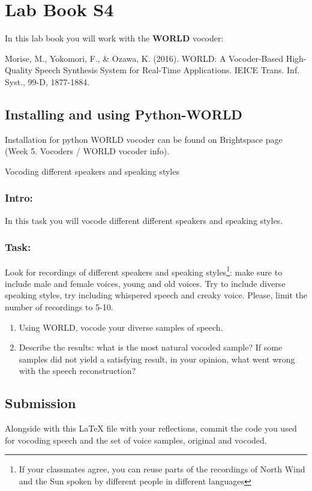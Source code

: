 \documentclass{../labbook}
\begin{document}
\section{Lab Book S4}
\noindent In this lab book you will work with the \textbf{WORLD} vocoder:

\noindent Morise, M., Yokomori, F., \& Ozawa, K. (2016). WORLD: A Vocoder-Based High-Quality Speech Synthesis System for Real-Time Applications. IEICE Trans. Inf.
Syst., 99-D, 1877-1884. 
        

\subsection*{Installing and using Python-WORLD}
Installation for python WORLD vocoder can be found on Brightspace page (Week 5. Vocoders / WORLD vocoder info).

\begin{problem}{1}{10}{Vocoding different speakers and speaking styles}
\subsubsection*{Intro:}
In this task you will vocode different different speakers and speaking styles.

\subsubsection*{Task:}
\noindent Look for recordings of different speakers and speaking styles\footnote{If your classmates agree, you can reuse parts of the recordings of North Wind and the Sun spoken by different people in different languages}: make sure to include male and female voices, young and old voices. Try to include diverse speaking styles, try including whispered speech and creaky voice. Please, limit the number of recordings to 5-10.

\begin{enumerate}
    \item Using WORLD, vocode your diverse samples of speech.
    \item Describe the results: what is the most natural vocoded sample? If some samples did not yield a satisfying result, in your opinion, what went wrong with the speech reconstruction?
\end{enumerate}

\subsection*{Submission}
\noindent Alongside with this LaTeX file with your reflections, commit the code you used for vocoding speech and the set of voice samples, original and vocoded. 
\end{problem}
\end{document}
